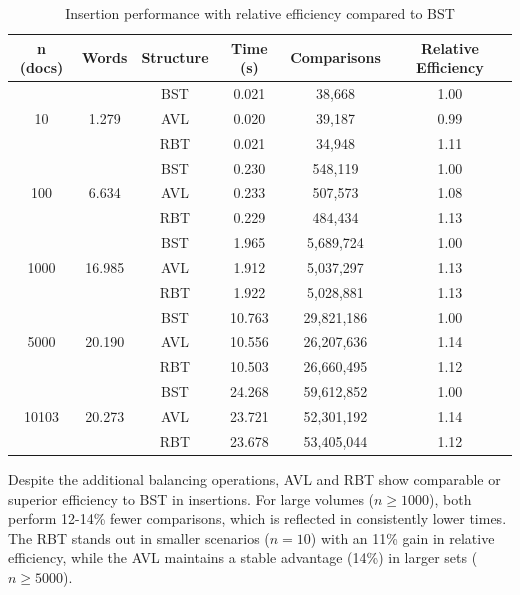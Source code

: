  \begin{table}[H]
     \centering
     \begin{tabular}{|c|c|c|c|c|c|}
     \hline
     \textbf{n (docs)} & \textbf{Words} & \textbf{Structure} & \textbf{Time (s)} & \textbf{Comparisons} & \textbf{Relative Efficiency} \\
     \hline
     \multirow{3}{*}{10} & \multirow{3}{*}{1.279} & BST & 0.021 & 38,668 & 1.00 \\
     & & AVL & 0.020 & 39,187 & 0.99 \\
     & & RBT & 0.021 & 34,948 & 1.11 \\
     \hline
     \multirow{3}{*}{100} & \multirow{3}{*}{6.634} & BST & 0.230 & 548,119 & 1.00 \\
     & & AVL & 0.233 & 507,573 & 1.08 \\
     & & RBT & 0.229 & 484,434 & 1.13 \\
     \hline
     \multirow{3}{*}{1000} & \multirow{3}{*}{16.985} & BST & 1.965 & 5,689,724 & 1.00 \\
     & & AVL & 1.912 & 5,037,297 & 1.13 \\
     & & RBT & 1.922 & 5,028,881 & 1.13 \\
     \hline
     \multirow{3}{*}{5000} & \multirow{3}{*}{20.190} & BST & 10.763 & 29,821,186 & 1.00 \\
     & & AVL & 10.556 & 26,207,636 & 1.14 \\
     & & RBT & 10.503 & 26,660,495 & 1.12 \\
     \hline
     \multirow{3}{*}{10103} & \multirow{3}{*}{20.273} & BST & 24.268 & 59,612,852 & 1.00 \\
     & & AVL & 23.721 & 52,301,192 & 1.14 \\
     & & RBT & 23.678 & 53,405,044 & 1.12 \\
     \hline
     \end{tabular}
     \caption{Insertion performance with relative efficiency compared to BST}
     \label{tab:insercao_completa}
 \end{table}

 Despite the additional balancing operations, AVL and RBT show comparable
 or superior efficiency to BST in insertions. For large volumes ($n \geq 1000$), both perform 12-14\% fewer
 comparisons, which is reflected in consistently lower times. The RBT stands out in smaller scenarios
 ($n = 10$) with an 11\% gain in relative efficiency, while the AVL maintains a stable advantage
 (14\%) in larger sets ($n \geq 5000$).

